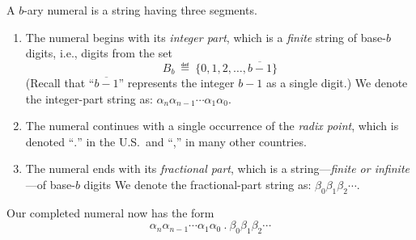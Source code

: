 \noindent
A $b$-ary numeral is a string having three segments.
\begin{enumerate}
\item
The numeral begins with its {\em integer part},
which is a {\em finite} string of base-$b$ digits, i.e., digits from
the set 
\begin{equation}
\label{eq:b-ary-digits}
B_b \ \eqdef \ \{0, 1, 2, \ldots, \overline{b-1}\}
\end{equation}
(Recall that ``$\overline{b-1}$'' represents the integer $b-1$ as a
single digit.)  
We denote the integer-part string as: $\alpha_n \alpha_{n-1} \cdots
\alpha_1 \alpha_0$.

\item
The numeral continues with a single occurrence of the {\it
  radix point},
which is denoted ``$.$'' in the U.S.~and ``,'' in many other countries. 

\item
The numeral ends with its {\em fractional part},
which is a string---{\em finite or infinite}---of base-$b$ digits We
denote the fractional-part string as: $\beta_0 \beta_1 \beta_2
\cdots$.
\end{enumerate}
Our completed numeral now has the form
\begin{equation}
\label{eq:real-numeral}
\alpha_n \alpha_{n-1} \cdots \alpha_1 \alpha_0
\ . \ \beta_0 \beta_1 \beta_2 \cdots
\end{equation}

